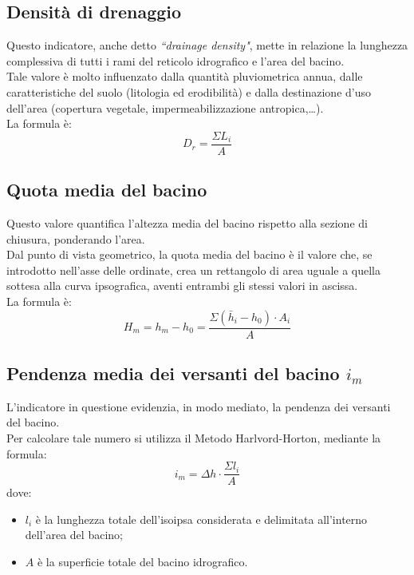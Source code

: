 \subsection{Densità di drenaggio}
Questo indicatore, anche detto \textit{``drainage density"}, mette in relazione la lunghezza complessiva di tutti i rami del reticolo idrografico e l'area del bacino.\\
Tale valore è molto influenzato dalla quantità pluviometrica annua, dalle caratteristiche del suolo (litologia ed erodibilità) e dalla destinazione d'uso dell'area (copertura vegetale, impermeabilizzazione antropica,\dots).\\
La formula è:
\begin{equation}
    D_r = \frac{\Sigma L_i}{A}
    \label{drenaggio}
\end{equation}

\subsection{Quota media del bacino}
Questo valore quantifica l'altezza media del bacino rispetto alla sezione di chiusura, ponderando l'area.\\
Dal punto di vista geometrico, la quota media del bacino è il valore che, se introdotto nell'asse delle ordinate, crea un rettangolo di area uguale a quella sottesa alla curva ipsografica, aventi entrambi gli stessi valori in ascissa.\\
La formula è:
\begin{equation}
    H_m = h_m - h_0 = \frac{\Sigma (\bar{h}_i - h_0) \cdot A_i}{A}
    \label{quota_media}
\end{equation}

\subsection{Pendenza media dei versanti del bacino $i_m$}
L'indicatore in questione evidenzia, in modo mediato, la pendenza dei versanti del bacino.\\
Per calcolare tale numero si utilizza il Metodo Harlvord-Horton, mediante la formula:
\begin{equation}
    i_m = \Delta h \cdot \frac{\Sigma l_i}{A}
\end{equation}
dove: 
\begin{itemize}
 \item $l_i$ è la lunghezza totale dell'isoipsa considerata e delimitata all'interno dell'area del bacino;
 \item $A$ è la superficie totale del bacino idrografico.
\end{itemize}

